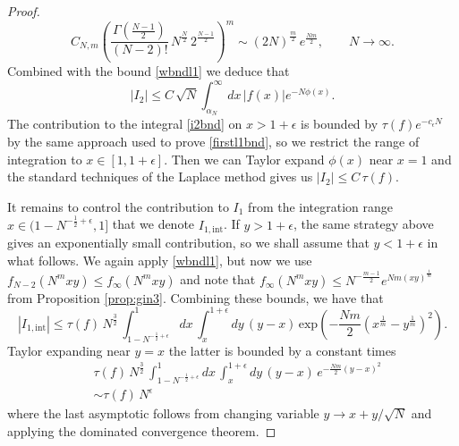 \documentclass[11pt,reqno]{amsproc}
\numberwithin{equation}{section}
\numberwithin{theorem}{section}
\begin{document}
\begin{proof}
\begin{equation}
C_{N,m}\left(\frac{\Gamma\left(\frac{N-1}{2}\right)}{(N-2)!}\,N^{\frac{N}{2}}\,2^{\frac{N-1}{2}}\right)^{m} \sim (2N)^{\frac{m}{2}}\,e^{\frac{Nm}{2}}, \qquad N\to \infty.
\end{equation}
Combined with the bound \eqref{wbndl1} we deduce that \begin{equation}
|I_{2}| \leq C\,\sqrt{N}\int_{\alpha_{N}}^{\infty}dx\,|f(x)|e^{-N\phi(x)}. \label{i2bnd}
\end{equation}
The contribution to the integral \eqref{i2bnd} on $x > 1+\epsilon$ is bounded by $\tau(f)e^{-c_{\epsilon}N}$ by the same approach used to prove \eqref{firstl1bnd}, so we restrict the range of integration to $x \in [1,1+\epsilon]$. Then we can Taylor expand $\phi(x)$ near $x=1$ and the standard techniques of the Laplace method gives us $|I_{2}| \leq C\,\tau(f)$.
 
It remains to control the contribution to $I_{1}$ from the integration range $x \in (1-N^{-\frac{1}{2}+\epsilon},1]$ that we denote $I_{1,\mathrm{int}}$. If $y>1+\epsilon$, the same strategy above gives an exponentially small contribution, so we shall assume that $y < 1+\epsilon$ in what follows. We again apply \eqref{wbndl1}, but now we use $f_{N-2}(N^{m}xy) \leq f_{\infty}(N^{m}xy)$ and note that $f_{\infty}(N^{m}xy) \leq N^{-\frac{m-1}{2}}e^{Nm(xy)^{\frac{1}{m}}}$ from Proposition \ref{prop:gin3}. Combining these bounds, we have 
that 
\begin{equation}
|I_{1,\mathrm{int}}| \leq \tau(f)\,N^{\frac{3}{2}}\,\int_{1-N^{-\frac{1}{2}+\epsilon}}^{1}dx\,\int_{x}^{1+\epsilon}dy\,(y-x)\,\mathrm{exp}\left(-\frac{Nm}{2}\left(x^{\frac{1}{m}}-y^{\frac{1}{m}}\right)^{2}\right). \label{Iintbnd}
\end{equation}
Taylor expanding near $y=x$ the latter is bounded by a constant times
\begin{align}
&\tau(f)\,N^{\frac{3}{2}}\,\int_{1-N^{-\frac{1}{2}+\epsilon}}^{1}dx\,\int_{x}^{1+\epsilon}dy\,(y-x)\,e^{-\frac{Nm}{2}(y-x)^{2}}\\
&\sim \tau(f)\,N^{\epsilon} \label{finall1bnd}
\end{align}
where the last asymptotic follows from changing variable $y \to x+y/\sqrt{N}$ and applying the dominated convergence theorem.


\end{proof}
\end{document}
